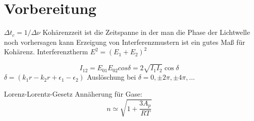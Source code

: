 \section{Vorbereitung}
$\Delta t_c  = 1/ \Delta \nu$
Kohärenzzeit ist die Zeitspanne in der man die Phase der Lichtwelle noch vorhersagen kann
Erzeigung von Interferenzmustern ist ein gutes Maß für Kohärenz.
Interferenztherm
$E^2 = (E_1 +E_2)^2$

$$I_{12} = E_{01}E_{02}cos{\delta} = 2 \sqrt{I_1 I_2} \cos{\delta}$$
$\delta = (k_1 r- k_2 r + \epsilon_1-\epsilon_2)$
Auslöschung bei $\delta= 0, \pm 2\pi,\pm4\pi,\dots$

Lorenz-Lorentz-Gesetz
Annäherung für Gase:
$$n \simeq \sqrt{1 + \frac{3A_p}{R T}} $$